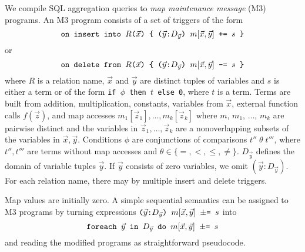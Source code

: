 We compile SQL aggregation queries to {\em map maintenance
message}\/ (M3) programs. An M3 program consists of a set of triggers of
the form
\[
\mbox{{\tt on insert into $R$($\vec{x}$) \{
($\vec{y}$:$D_{\vec{y}}$) $m[\vec{x}, \vec{y}]$ += $s$
\}}}
\]
or
\[
\mbox{{\tt on delete from $R$($\vec{x}$) \{
($\vec{y}$:$D_{\vec{y}}$) $m[\vec{x}, \vec{y}]$ -= $s$
\}}}
\]
where $R$ is a relation name,
$\vec{x}$ and $\vec{y}$ are distinct tuples of variables and
$s$ is either a term or of the form
{\tt if $\phi$ then $t$ else 0}, where $t$ is a term.
Terms are built from addition, multiplication,
constants, variables from $\vec{x}$, external function calls $f(\vec{z})$,
and map accesses $m_1[\vec{z}_1], \dots, m_k[\vec{z}_k]$ where
$m$, $m_1$, $\dots$, $m_k$ are pairwise distinct
and the variables in $\vec{z}_1, \dots, \vec{z}_k$ are a nonoverlapping
subsets of the variables in $\vec{x}, \vec{y}$.
Conditions $\phi$ are conjunctions of comparisons $t'' \;\theta\; t'''$,
where $t'',t'''$ are terms without map accesses and
$\theta \in \{ =,<,\le,\neq \}$.
$D_{\vec{y}}$ defines the domain of variable tuples $\vec{y}$.
If $\vec{y}$ consists of zero variables, we omit $(\vec{y}: D_{\vec{y}})$.
For each relation name, there may by multiple insert and delete triggers.


Map values are initially zero. 
A simple sequential semantics can be assigned to M3 programs by turning
expressions
$
\mbox{{\tt ($\vec{y}$:$D_{\vec{y}}$) $m[\vec{x}, \vec{y}]$ $\pm$= $s$}}
$
into
\[
\mbox{{\tt foreach $\vec{y}$ in $D_{\vec{y}}$ do
$m[\vec{x}, \vec{y}]$ $\pm$= $s$}}
\]
and reading the modified programs as straightforward pseudocode.


